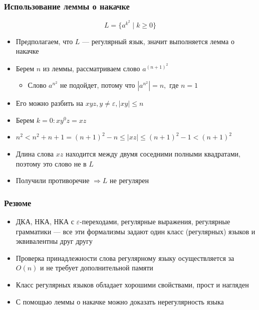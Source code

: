 \documentclass{beamer}
\begin{document}
\begin{frame}[fragile]
  \transwipe[direction=90]
  \frametitle{Использование леммы о накачке}
\[ L = \{ a^{k^2} \mid k \geq 0\} \]

  \begin{itemize}
    \item Предполагаем, что $L$ --- регулярный язык, значит выполняется лемма о накачке 
    \item Берем $n$ из леммы, рассматриваем слово $a^{(n+1)^2}$ 
    \begin{itemize}
      \item Слово $a^{n^2}$ не подойдет, потому что $|a^{n^2}| = n, \text{ где } n = 1$
    \end{itemize}
    \item Его можно разбить на $xyz, y \neq \varepsilon, |xy| \leq n$
    \item Берем $k = 0: xy^0z = xz$
    \item $n^2 < n^2 + n + 1 = (n+1)^2 - n \leq |xz| \leq (n+1)^2 - 1 < (n+1)^2$
    \item Длина слова $xz$ находится между двумя соседними полными квадратами, поэтому это слово не в $L$
    \item Получили противоречие $\Rightarrow L$  не регулярен
  \end{itemize}
  
\end{frame}

\begin{frame}[fragile]
  \transwipe[direction=90]
  \frametitle{Резюме}
  \begin{itemize}
    \item ДКА, НКА, НКА с $\varepsilon$-переходами, регулярные выражения, регулярные грамматики --- все эти формализмы задают один класс (регулярных) языков и эквивалентны друг другу
    \item Проверка принадлежности слова регулярному языку осуществляется за $O(n)$ и не требует дополнительной памяти
    \item Класс регулярных языков обладает хорошими свойствами, прост и нагляден
    \item С помощью леммы о накачке можно доказать нерегулярность языка
  \end{itemize}
  
\end{frame}
\end{document}
